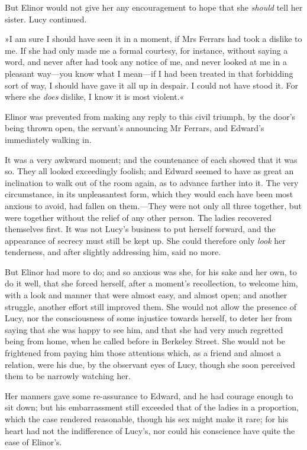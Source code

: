 But Elinor would not give her any encouragement to hope that she \textit{should} tell her sister. Lucy continued.

»I am sure I should have seen it in a moment, if Mrs Ferrars had took a dislike to me. If she had only made me a formal courtesy, for instance, without saying a word, and never after had took any notice of me, and never looked at me in a pleasant way—you know what I mean—if I had been treated in that forbidding sort of way, I should have gave it all up in despair. I could not have stood it. For where she \textit{does} dislike, I know it is most violent.«

Elinor was prevented from making any reply to this civil triumph, by the door’s being thrown open, the servant’s announcing Mr Ferrars, and Edward’s immediately walking in.

It was a very awkward moment; and the countenance of each showed that it was so. They all looked exceedingly foolish; and Edward seemed to have as great an inclination to walk out of the room again, as to advance farther into it. The very circumstance, in its unpleasantest form, which they would each have been most anxious to avoid, had fallen on them.—They were not only all three together, but were together without the relief of any other person. The ladies recovered themselves first. It was not Lucy’s business to put herself forward, and the appearance of secrecy must still be kept up. She could therefore only \textit{look} her tenderness, and after slightly addressing him, said no more.

But Elinor had more to do; and so anxious was she, for his sake and her own, to do it well, that she forced herself, after a moment’s recollection, to welcome him, with a look and manner that were almost easy, and almost open; and another struggle, another effort still improved them. She would not allow the presence of Lucy, nor the consciousness of some injustice towards herself, to deter her from saying that she was happy to see him, and that she had very much regretted being from home, when he called before in Berkeley Street. She would not be frightened from paying him those attentions which, as a friend and almost a relation, were his due, by the observant eyes of Lucy, though she soon perceived them to be narrowly watching her.

Her manners gave some re-assurance to Edward, and he had courage enough to sit down; but his embarrassment still exceeded that of the ladies in a proportion, which the case rendered reasonable, though his sex might make it rare; for his heart had not the indifference of Lucy’s, nor could his conscience have quite the ease of Elinor’s.

